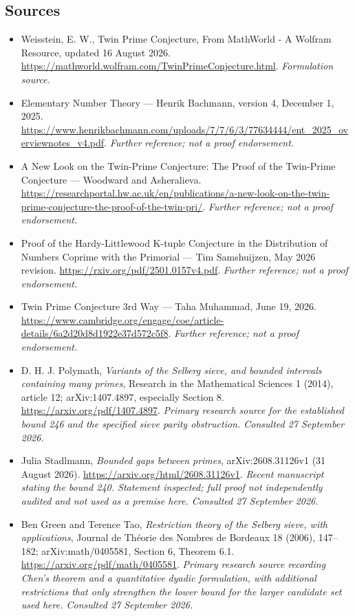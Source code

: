 \documentclass[11pt]{article}
\begin{document}
\subsection{Sources}
\begin{itemize}
\item[S1]Weisstein, E. W., Twin Prime Conjecture, From MathWorld - A Wolfram Resource, updated 16 August 2026.
\url{https://mathworld.wolfram.com/TwinPrimeConjecture.html}.
\textit{Formulation source.}
\item[S2]Elementary Number Theory — Henrik Bachmann, version 4, December 1, 2025.
\url{https://www.henrikbachmann.com/uploads/7/7/6/3/77634444/ent_2025_overviewnotes_v4.pdf}.
\textit{Further reference; not a proof endorsement.}
\item[S3]A New Look on the Twin-Prime Conjecture: The Proof of the Twin-Prime Conjecture — Woodward and Asheralieva.
\url{https://researchportal.hw.ac.uk/en/publications/a-new-look-on-the-twin-prime-conjecture-the-proof-of-the-twin-pri/}.
\textit{Further reference; not a proof endorsement.}
\item[S4]Proof of the Hardy-Littlewood K-tuple Conjecture in the Distribution of Numbers Coprime with the Primorial — Tim Samshuijzen, May 2026 revision.
\url{https://rxiv.org/pdf/2501.0157v4.pdf}.
\textit{Further reference; not a proof endorsement.}
\item[S5]Twin Prime Conjecture 3rd Way — Taha Muhammad, June 19, 2026.
\url{https://www.cambridge.org/engage/coe/article-details/6a2d20d8d1922e37d572c5f8}.
\textit{Further reference; not a proof endorsement.}

\item[E1]D. H. J. Polymath, \emph{Variants of the Selberg sieve, and
bounded intervals containing many primes}, Research in the Mathematical
Sciences 1 (2014), article 12; arXiv:1407.4897, especially Section 8.
\url{https://arxiv.org/pdf/1407.4897}.
\textit{Primary research source for the established bound 246 and the
specified sieve parity obstruction. Consulted 27 September 2026.}
\item[E2]Julia Stadlmann, \emph{Bounded gaps between primes},
arXiv:2608.31126v1 (31 August 2026).
\url{https://arxiv.org/html/2608.31126v1}.
\textit{Recent manuscript stating the bound 240. Statement inspected;
full proof not independently audited and not used as a premise here.
Consulted 27 September 2026.}
\item[E3]Ben Green and Terence Tao,
\emph{Restriction theory of the Selberg sieve, with applications},
Journal de Th\'eorie des Nombres de Bordeaux 18 (2006), 147--182;
arXiv:math/0405581, Section 6, Theorem 6.1.
\url{https://arxiv.org/pdf/math/0405581}.
\textit{Primary research source recording Chen's theorem and a quantitative
dyadic formulation, with additional restrictions that only strengthen the
lower bound for the larger candidate set used here.
Consulted 27 September 2026.}
\end{itemize}
\end{document}
